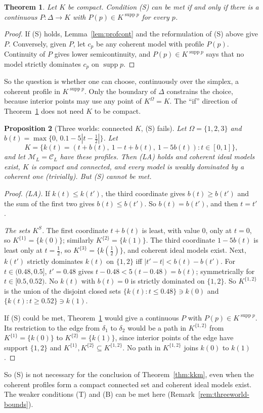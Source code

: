 \documentclass[11pt]{article}
\newtheorem{theorem}{Theorem}[section]
\newtheorem{proposition}[theorem]{Proposition}
\theoremstyle{definition}
\theoremstyle{remark}
\newcommand{\M}{\mathcal M}
\newcommand{\C}{\mathcal C}
\newcommand{\supp}{\operatorname{supp}}
\begin{document}
\begin{theorem}\label{thm:selection}
Let $K$ be compact. Condition (S) can be met if and only if there is a continuous $P:\Delta\to K$ with $P(p)\in K^{\supp p}$ for every $p$.
\end{theorem}
\begin{proof}
If (S) holds, Lemma~\ref{lem:profcont} and the reformulation of (S) above give $P$. Conversely, given $P$, let $c_p$ be any coherent model with profile $P(p)$. Continuity of $P$ gives lower semicontinuity, and $P(p)\in K^{\supp p}$ says that no model strictly dominates $c_p$ on $\supp p$.
\end{proof}
So the question is whether one can choose, continuously over the simplex, a coherent profile in $K^{\supp p}$. Only the boundary of $\Delta$ constrains the choice, because interior points may use any point of $K^\Omega=K$. The ``if'' direction of Theorem~\ref{thm:selection} does not need $K$ to be compact.


\begin{proposition}[Three worlds: connected $K$, (S) fails]\label{prop:threeworld}
Let $\Omega=\{1,2,3\}$ and $b(t)=\max\{0,\,0.1-5|t-\tfrac12|\}$. Let
\[
 K=\{k(t)=(t+b(t),\ 1-t+b(t),\ 1-5b(t)):t\in[0,1]\},
\]
and let $\M_L=\C_L$ have these profiles. Then (LA) holds and coherent ideal models exist, $K$ is compact and connected, and every model is weakly dominated by a coherent one (trivially). But (S) cannot be met.
\end{proposition}
\begin{proof}
\emph{(LA).} If $k(t)\le k(t')$, the third coordinate gives $b(t)\ge b(t')$ and the sum of the first two gives $b(t)\le b(t')$. So $b(t)=b(t')$, and then $t=t'$.

\emph{The sets $K^S$.} The first coordinate $t+b(t)$ is least, with value $0$, only at $t=0$, so $K^{\{1\}}=\{k(0)\}$; similarly $K^{\{2\}}=\{k(1)\}$. The third coordinate $1-5b(t)$ is least only at $t=\tfrac12$, so $K^{\{3\}}=\{k(\tfrac12)\}$, and coherent ideal models exist. Next, $k(t')$ strictly dominates $k(t)$ on $\{1,2\}$ iff $|t'-t|<b(t)-b(t')$. For $t\in(0.48,0.5]$, $t'=0.48$ gives $t-0.48<5(t-0.48)=b(t)$; symmetrically for $t\in[0.5,0.52)$. No $k(t)$ with $b(t)=0$ is strictly dominated on $\{1,2\}$. So $K^{\{1,2\}}$ is the union of the disjoint closed sets $\{k(t):t\le0.48\}\ni k(0)$ and $\{k(t):t\ge0.52\}\ni k(1)$.

If (S) could be met, Theorem~\ref{thm:selection} would give a continuous $P$ with $P(p)\in K^{\supp p}$. Its restriction to the edge from $\delta_1$ to $\delta_2$ would be a path in $K^{\{1,2\}}$ from $K^{\{1\}}=\{k(0)\}$ to $K^{\{2\}}=\{k(1)\}$, since interior points of the edge have support $\{1,2\}$ and $K^{\{1\}},K^{\{2\}}\subseteq K^{\{1,2\}}$. No path in $K^{\{1,2\}}$ joins $k(0)$ to $k(1)$.
\end{proof}
So (S) is not necessary for the conclusion of Theorem~\ref{thm:kkm}, even when the coherent profiles form a compact connected set and coherent ideal models exist. The weaker conditions (T) and (B) can be met here (Remark~\ref{rem:threeworld-bounds}).
\end{document}
